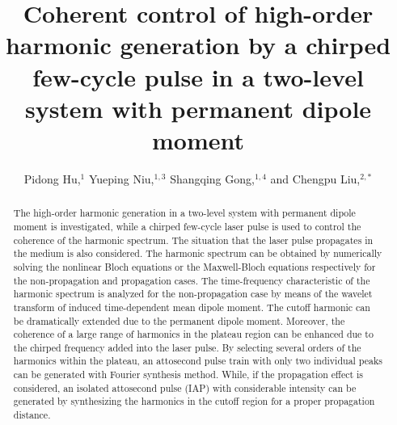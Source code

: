 \documentclass[10pt,letterpaper]{article}
\begin{document}
\title{Coherent control of high-order harmonic generation by a chirped few-cycle pulse in a two-level system with permanent dipole moment}

\author{Pidong Hu,$^1$ Yueping Niu,$^{1,3}$ Shangqing Gong,$^{1,4}$  and Chengpu Liu,$^{2,*}$}

\address{$^1$Department of Physics, East China University of Science and Technology, \\
Meilong Road 130, Shanghai 200237, China\\
$^2$State Key Laboratory of High Field Laser Physics, Shanghai Institute of Optics and Fine Mechanics, Chinese Academy of Sciences, Qinghe Road 390, Shanghai 201800, China\\
$^{3}$niuyp@ecust.edu.cn\\
$^{4}$sqgong@ecust.edu.cn
}




\begin{abstract}
The high-order harmonic generation in a two-level system with permanent dipole moment is investigated, while a chirped few-cycle laser pulse is used to control the coherence of the harmonic spectrum. The situation that the laser pulse propagates in the medium is also considered. The harmonic spectrum can be obtained by numerically solving the nonlinear Bloch equations or the Maxwell-Bloch equations respectively for the non-propagation and propagation cases. The time-frequency characteristic of the harmonic spectrum is analyzed for the non-propagation case by means of the wavelet transform of induced time-dependent mean dipole moment. The cutoff harmonic  can be dramatically extended due to the permanent dipole moment. Moreover, the coherence of a large range of harmonics in the plateau region can be enhanced due to the chirped frequency added into the laser pulse. By selecting several orders of the harmonics within the plateau, an attosecond pulse train with only two individual peaks can be generated with Fourier synthesis method. While, if the propagation effect is considered, an isolated attosecond pulse (IAP) with considerable intensity can be generated by synthesizing the harmonics in the cutoff region for a proper propagation distance.
\end{abstract}
\end{document}
